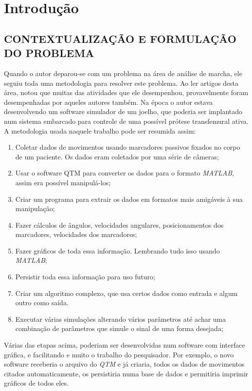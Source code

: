 \chapter[INTRODUÇÃO]{\textbf {Introdução}}
\section{CONTEXTUALIZAÇÃO E FORMULAÇÃO DO PROBLEMA}
Quando o autor deparou-se com um problema na área de análise de marcha, 
ele seguiu toda uma metodologia para resolver este problema. 
Ao ler artigos desta área, notou que muitas das atividades que ele desempenhou, provavelmente foram desempenhadas por aqueles autores também. 
Na época o autor estava desenvolvendo um software simulador de um joelho, que poderia ser implantado num sistema embarcado para controle de uma possível prótese transfemural ativa.
A metodologia usada naquele trabalho pode ser resumida assim:
\begin{enumerate}
	\item Coletar dados de movimentos usando marcadores passivos fixados no corpo de um paciente. Os dados eram coletados por uma série de câmeras;
	\item Usar o software QTM para converter os dados para o formato \emph{MATLAB}, assim era possível manipulá-los;
	\item Criar um programa para extrair os dados em formatos mais amigáveis à sua manipulação;
	\item Fazer cálculos de ângulos, velocidades angulares, posicionamentos dos marcadores, velocidades dos marcadores;
	\item Fazer gráficos de toda essa informação. Lembrando tudo isso usando \emph{MATLAB};
	\item Persistir toda essa informação para uso futuro;
	\item Criar um algoritmo complexo, que usa certos dados como entrada e algum outro como saída.
	\item Executar várias simulações alterando vários parâmetros até achar uma combinação de parâmetros que simule o sinal de uma forma desejada;
\end{enumerate}

Várias das etapas acima, poderiam ser desenvolvidas num software com interface gráfica, e facilitando e muito o trabalho do pesquisador. Por exemplo, o novo software receberia o arquivo do \emph{QTM} e já criaria, todos os dados de movimentos citados automaticamente, os persistiria numa base de dados e permitiria imprimir gráficos de todos eles.

